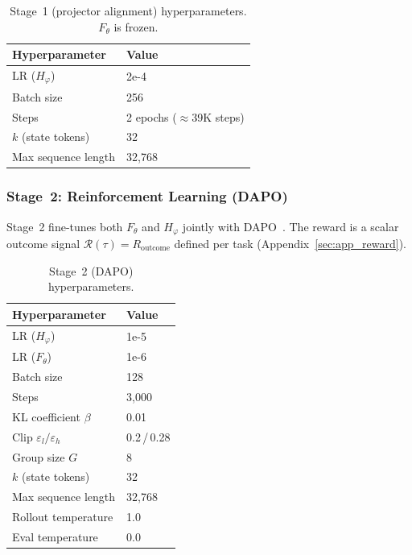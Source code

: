 \begin{table}[h]
\centering
\small
\begin{tabular}{ll}
\toprule
\textbf{Hyperparameter}        & \textbf{Value} \\
\midrule
LR ($H_\varphi$)               & 2e-4 \\
Batch size                     & 256 \\
Steps                          & 2 epochs (${\approx}$39K steps) \\
$k$ (state tokens)             & 32 \\
Max sequence length            & 32{,}768 \\
\bottomrule
\end{tabular}
\vspace{2mm}\caption{Stage~1 (projector alignment) hyperparameters. $F_\theta$ is frozen.}
\label{tab:hparams_stage1}
\end{table}

\subsubsection{Stage~2: Reinforcement Learning (DAPO)}
\label{sec:app_stage2}

Stage~2 fine-tunes both $F_\theta$ and $H_\varphi$ jointly with DAPO~\cite{yu2025dapo}.
The reward is a scalar outcome signal
$\mathcal{R}(\tau) = R_{\mathrm{outcome}}$
defined per task (Appendix~\ref{sec:app_reward}).

\begin{table}[h]
\centering
\small
\begin{tabular}{ll}
\toprule
\textbf{Hyperparameter}        & \textbf{Value} \\
\midrule
LR ($H_\varphi$)               & 1e-5 \\
LR ($F_\theta$)                & 1e-6 \\
Batch size                     & 128 \\
Steps                          & 3{,}000 \\
KL coefficient $\beta$         & 0.01 \\
Clip $\varepsilon_l / \varepsilon_h$ & 0.2\,/\,0.28 \\
Group size $G$                 & 8 \\
$k$ (state tokens)             & 32 \\
Max sequence length            & 32{,}768 \\
Rollout temperature            & 1.0 \\
Eval temperature               & 0.0 \\
\bottomrule
\end{tabular}
\vspace{2mm}\caption{Stage~2 (DAPO) hyperparameters.}
\label{tab:hparams_stage2}
\end{table}

